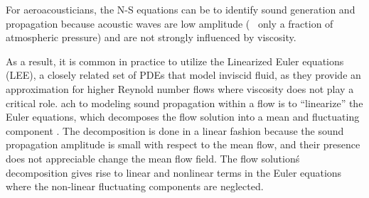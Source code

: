 For aeroacousticians, the N-S equations can be  
to identify sound generation and propagation because acoustic waves are low 
amplitude (~ only a fraction of atmospheric pressure) and are not strongly
influenced by viscosity.   

As a result, it is common in practice to 
utilize the Linearized Euler equations (LEE),
a closely related set of PDEs that model inviscid fluid, as they provide an 
approximation for higher Reynold number flows where viscosity 
does not play a critical role. ach to modeling sound propagation 
within a flow is to ``linearize'' the Euler equations, which decomposes the 
flow solution into a mean and fluctuating component . The decomposition is done 
in a linear fashion because the sound propagation amplitude is small with respect
to the mean flow, and their presence does not appreciable change the mean flow 
field. The flow solution\'s decomposition gives rise to linear and nonlinear terms 
in the Euler equations where the non-linear fluctuating components are neglected. 

